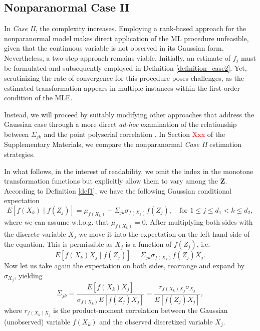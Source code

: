 \subsection{Nonparanormal Case II}\label{sec::nonparanormal_case2}

In \textit{Case II}, the complexity increases. Employing a rank-based approach for the nonparanormal model makes direct application of the ML procedure unfeasible, given that the continuous variable is not observed in its Gaussian form. Nevertheless, a two-step approach remains viable. Initially, an estimate of \(f_j\) must be formulated and subsequently employed in Definition \ref{definition_case2}. Yet, scrutinizing the rate of convergence for this procedure poses challenges, as the estimated transformation appears in multiple instances within the first-order condition of the MLE.

Instead, we will proceed by suitably modifying other approaches that address the Gaussian case through a more direct \textit{ad-hoc} examination of the relationship between $\Sigma_{jk}$ and the point polyserial correlation \citep{Bedrick92, Bedrick96}.
In Section \textcolor{red}{Xxx} of the Supplementary Materials, we compare the nonparanormal \textit{Case II} estimation strategies.

In what follows, in the interest of readability, we omit the index in the monotone transformation functions but explicitly allow them to vary among the $\mathbf{Z}$. According to Definition \ref{def1}, we have the following Gaussian conditional expectation
\begin{equation}
    E[f(X_k) \mid f(Z_j)] = \mu_{f(X_k)} + \Sigma_{jk}\sigma_{f(X_k)} f(Z_j), \quad \text{for } 1 \leq j \leq d_1 < k \leq d_2,
\end{equation}
where we can assume w.l.o.g. that $\mu_{f(X_k)} = 0$. After multiplying both sides with the discrete variable $X_j$ we move it into the expectation on the left-hand side of the equation. This is permissible as $X_j$ is a function of $f(Z_j)$, i.e.
\begin{equation*}
    E[f(X_k)X_j \mid f(Z_j)] = \Sigma_{jk}\sigma_{f(X_k)} f(Z_j)X_j.
\end{equation*}
Now let us take again the expectation on both sides, rearrange and expand by $\sigma_{X_j}$, yielding
\begin{equation}\label{population_polyserial_nonpara}
        \Sigma_{jk} = \frac{E[f(X_k)X_j]}{\sigma_{f(X_k)} E[f(Z_j)X_j]} = \frac{r_{f(X_k)X_j}\sigma_{X_j}}{E[f(Z_j)X_j]},
\end{equation}
where $r_{f(X_k)X_j}$ is the product-moment correlation between the Gaussian (unobserved) variable $f(X_k)$ and the observed discretized variable $X_j$.

